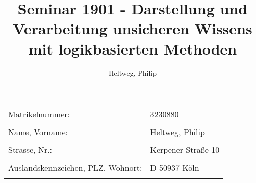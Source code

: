 \documentclass[11pt]{article}
\begin{document}
\title{Seminar 1901 - Darstellung und Verarbeitung unsicheren Wissens mit logikbasierten Methoden}
\author{
	Heltweg, Philip
}
\maketitle

\begin{tabular}{l l}
Matrikelnummer: & 3230880\\
\\
Name, Vorname: & Heltweg, Philip\\
\\
Strasse, Nr.: & Kerpener Straße 10\\
\\
Auslandskennzeichen, PLZ, Wohnort: & D 50937 Köln\\
\\
\end{tabular}

\newpage
\end{document}
